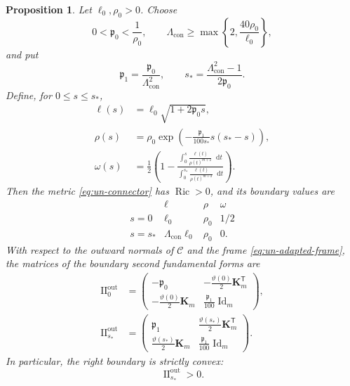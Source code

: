 \documentclass[11pt,reqno]{amsart}
\newtheorem{proposition}[theorem]{Proposition}
\theoremstyle{definition}
\numberwithin{equation}{section}
\DeclareMathOperator{\Ric}{Ric}
\DeclareMathOperator{\II}{II}
\newcommand{\dd}{\mathop{}\!\mathrm d}
\begin{document}
\begin{proposition}
\label{prop:un-connector}
Let \(\ell_0,\rho_0>0\).  Choose
\[
 0<\mathfrak p_0<\frac1{\rho_0},
 \qquad
 \Lambda_{\mathrm{con}}\ge
 \max\left\{2,\frac{40\rho_0}{\ell_0}\right\},
\]
and put
\begin{equation}\label{eq:un-connector-parameters}
 \mathfrak p_1=\frac{\mathfrak p_0}{\Lambda_{\mathrm{con}}^2},
 \qquad
 s_*=\frac{\Lambda_{\mathrm{con}}^2-1}{2\mathfrak p_0}.
\end{equation}
Define, for \(0\le s\le s_*\),
\begin{align}
 \ell(s)&=\ell_0\sqrt{1+2\mathfrak p_0s},
 \label{eq:un-ell-profile}\\
 \rho(s)&=\rho_0\exp\left(
 -\frac{\mathfrak p_1}{100s_*}s(s_*-s)\right),
 \label{eq:un-rho-profile}\\
\omega(s)&=\frac12\left(
  1-\frac{\displaystyle\int_0^s
               \frac{\ell(t)}{\rho(t)^{m+2}}\dd t}
             {\displaystyle\int_0^{s_*}
               \frac{\ell(t)}{\rho(t)^{m+2}}\dd t}
 \right).
 \label{eq:un-omega-profile}
\end{align}
Then the metric \eqref{eq:un-connector} has \(\Ric>0\), and its
boundary values are
\[
\begin{array}{c|c|c|c}
 &\ell&\rho&\omega\\ \hline
 s=0&\ell_0&\rho_0&1/2\\
 s=s_*&\Lambda_{\mathrm{con}}\ell_0&\rho_0&0.
\end{array}
\]
With respect to the outward normals of $\mathcal C$ and the frame
\eqref{eq:un-adapted-frame}, the matrices of the boundary second
fundamental forms are
\begin{align}
 \II^{\mathrm{out}}_0&=
 \begin{pmatrix}
  -\mathfrak p_0&-\frac{\vartheta(0)}2\mathbf K_m^{\mathsf T}\\[2pt]
  -\frac{\vartheta(0)}2\mathbf K_m&
     \frac{\mathfrak p_1}{100}\operatorname{Id}_m
 \end{pmatrix},
 \label{eq:un-II-left}\\
 \II^{\mathrm{out}}_{s_*}&=
 \begin{pmatrix}
  \mathfrak p_1&\frac{\vartheta(s_*)}2\mathbf K_m^{\mathsf T}\\[2pt]
  \frac{\vartheta(s_*)}2\mathbf K_m&
     \frac{\mathfrak p_1}{100}\operatorname{Id}_m
 \end{pmatrix}.
 \label{eq:un-II-right}
\end{align}
In particular, the right boundary is strictly convex:
\[
 \II^{\mathrm{out}}_{s_*}>0.
\]
\end{proposition}
\end{document}
